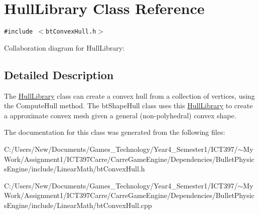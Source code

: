 \hypertarget{class_hull_library}{
\section{HullLibrary Class Reference}
\label{class_hull_library}
}
{\tt \#include $<$btConvexHull.h$>$}

Collaboration diagram for HullLibrary:

\subsection{Detailed Description}
The \hyperlink{class_hull_library}{HullLibrary} class can create a convex hull from a collection of vertices, using the ComputeHull method. The btShapeHull class uses this \hyperlink{class_hull_library}{HullLibrary} to create a approximate convex mesh given a general (non-polyhedral) convex shape. 

The documentation for this class was generated from the following files:\begin{CompactItemize}
\item 
C:/Users/New/Documents/Games\_\-Technology/Year4\_\-Semester1/ICT397/$\sim$My Work/Assignment1/ICT397Carre/CarreGameEngine/Dependencies/BulletPhysicsEngine/include/LinearMath/btConvexHull.h\item 
C:/Users/New/Documents/Games\_\-Technology/Year4\_\-Semester1/ICT397/$\sim$My Work/Assignment1/ICT397Carre/CarreGameEngine/Dependencies/BulletPhysicsEngine/include/LinearMath/btConvexHull.cpp\end{CompactItemize}
